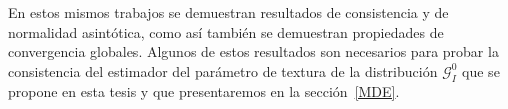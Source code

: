 En estos mismos trabajos se demuestran resultados de consistencia y de normalidad asintótica, como así también se demuestran propiedades de convergencia globales. Algunos de estos resultados son necesarios para probar la consistencia del estimador del parámetro de textura de la distribución $\mathcal{G}_I^0$ que se propone en esta tesis y que presentaremos en la sección~\ref{MDE}.

%
%

